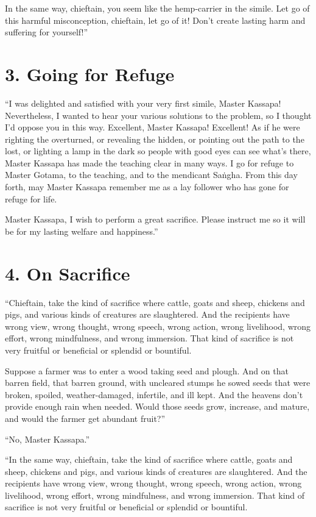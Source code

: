 \documentclass[12pt,openany]{book}%
\begin{document}
In the same way, chieftain, you seem like the hemp-carrier in the simile. Let go of this harmful misconception, chieftain, let go of it! Don’t create lasting harm and suffering for yourself!” 

\section*{3. Going for Refuge }

“I was delighted and satisfied with your very first simile, Master Kassapa! Nevertheless, I wanted to hear your various solutions to the problem, so I thought I’d oppose you in this way. Excellent, Master Kassapa! Excellent! As if he were righting the overturned, or revealing the hidden, or pointing out the path to the lost, or lighting a lamp in the dark so people with good eyes can see what’s there, Master Kassapa has made the teaching clear in many ways. I go for refuge to Master Gotama, to the teaching, and to the mendicant \textsanskrit{Saṅgha}. From this day forth, may Master Kassapa remember me as a lay follower who has gone for refuge for life. 

Master Kassapa, I wish to perform a great sacrifice. Please instruct me so it will be for my lasting welfare and happiness.” 

\section*{4. On Sacrifice }

“Chieftain, take the kind of sacrifice where cattle, goats and sheep, chickens and pigs, and various kinds of creatures are slaughtered. And the recipients have wrong view, wrong thought, wrong speech, wrong action, wrong livelihood, wrong effort, wrong mindfulness, and wrong immersion. That kind of sacrifice is not very fruitful or beneficial or splendid or bountiful. 

Suppose a farmer was to enter a wood taking seed and plough. And on that barren field, that barren ground, with uncleared stumps he sowed seeds that were broken, spoiled, weather-damaged, infertile, and ill kept. And the heavens don’t provide enough rain when needed. Would those seeds grow, increase, and mature, and would the farmer get abundant fruit?” 

“No, Master Kassapa.” 

“In the same way, chieftain, take the kind of sacrifice where cattle, goats and sheep, chickens and pigs, and various kinds of creatures are slaughtered. And the recipients have wrong view, wrong thought, wrong speech, wrong action, wrong livelihood, wrong effort, wrong mindfulness, and wrong immersion. That kind of sacrifice is not very fruitful or beneficial or splendid or bountiful. 
\end{document}
